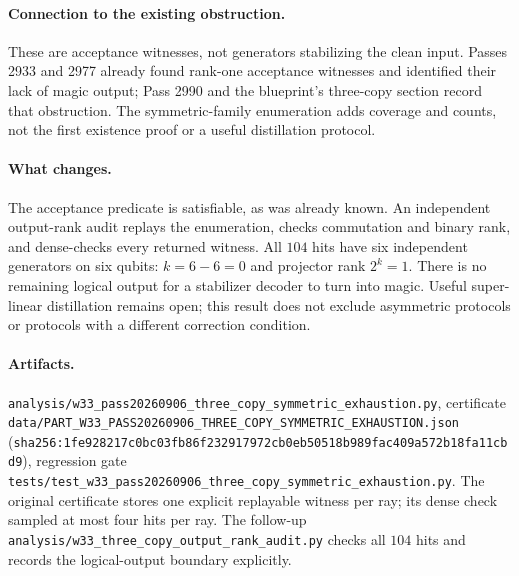 \paragraph{Connection to the existing obstruction.}
These are acceptance witnesses, not generators stabilizing the clean input.
Passes 2933 and 2977 already found rank-one acceptance witnesses and identified
their lack of magic output; Pass 2990 and the blueprint's three-copy section
record that obstruction. The symmetric-family enumeration adds coverage and
counts, not the first existence proof or a useful distillation protocol.

\paragraph{What changes.}
The acceptance predicate is satisfiable, as was already known. An independent
output-rank audit replays the enumeration, checks commutation and binary rank,
and dense-checks every returned witness. All $104$ hits have six independent
generators on six qubits: $k=6-6=0$ and projector rank $2^k=1$.
There is no remaining logical output for a stabilizer decoder to turn into
magic. Useful super-linear distillation remains open; this result does not
exclude asymmetric protocols or protocols with a different correction condition.

\paragraph{Artifacts.}
\texttt{analysis/w33\_pass20260906\_three\_copy\_symmetric\_exhaustion.py},
certificate
\texttt{data/PART\_W33\_PASS20260906\_THREE\_COPY\_SYMMETRIC\_EXHAUSTION.json}
(\texttt{sha256:1fe928217c0bc03fb86f232917972cb0eb50518b989fac409a572b18fa11cbd9}),
regression gate
\texttt{tests/test\_w33\_pass20260906\_three\_copy\_symmetric\_exhaustion.py}.
The original certificate stores one explicit replayable witness per ray; its
dense check sampled at most four hits per ray. The follow-up
\texttt{analysis/w33\_three\_copy\_output\_rank\_audit.py} checks all $104$ hits
and records the logical-output boundary explicitly.
